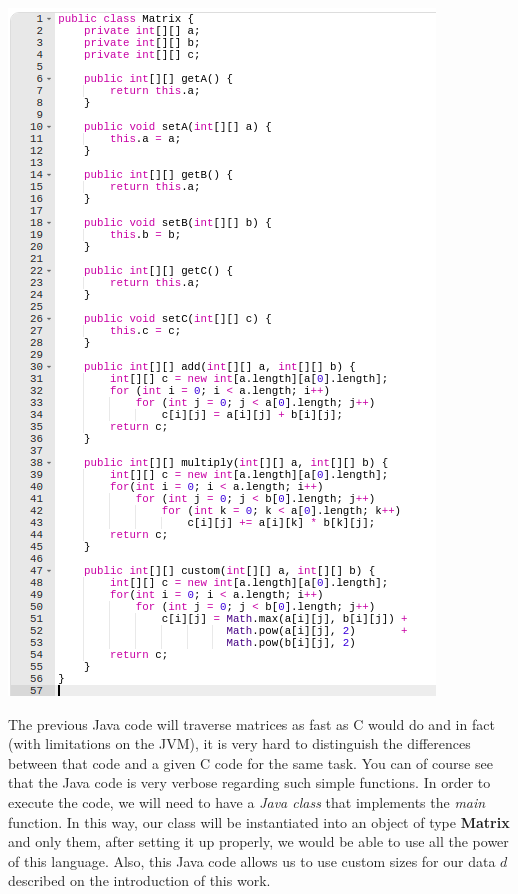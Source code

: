 \documentclass[conference]{IEEEtran}
\begin{document}
\includegraphics[scale=0.57]{java_code}

The previous Java code will traverse matrices as fast as C would do and in fact (with limitations on the JVM), it is very hard to distinguish the differences between that code and a given C code for the same task. You can of course see that the Java code is very verbose regarding such simple functions. In order to execute the code, we will need to have a \textit{Java class} that implements the \textit{main} function. In this way, our class will be instantiated into an object of type \textbf{Matrix} and only them, after setting it up properly, we would be able to use all the power of this language. Also, this Java code allows us to use custom sizes for our data $d$ described on the introduction of this work. 
\end{document}

